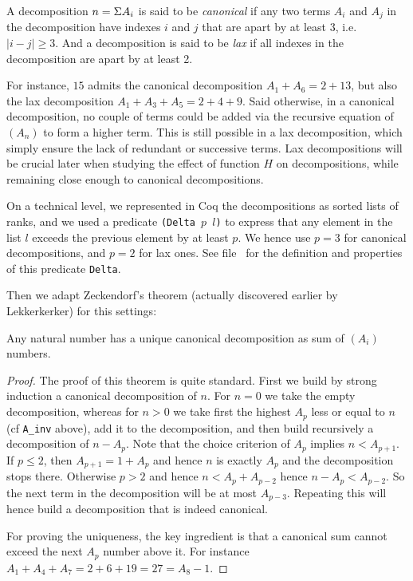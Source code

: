 \documentclass[a4paper,11pt]{article}
\begin{document}
\begin{definition}
 A decomposition $n = \Sigma A_i$ is said to be \emph{canonical} if
 any two terms $A_i$ and $A_j$ in the decomposition have indexes $i$
 and $j$ that are apart by at least 3, i.e. $|i-j|\ge 3$.
 And a decomposition is said to be \emph{lax} if all indexes in the
 decomposition are apart by at least 2.
\end{definition}

For instance, $15$ admits the canonical decomposition
$A_1+A_6 = 2 + 13$, but also the lax decomposition $A_1+A_3+A_5
= 2 + 4 + 9$.
Said otherwise, in a canonical decomposition, no couple of terms could
be added via the recursive equation of $(A_n)$ to form a higher term.
This is still possible in a lax decomposition, which simply ensure
the lack of redundant or successive terms. Lax decompositions will
be crucial later when studying the effect of function $H$ on
decompositions, while remaining close enough to canonical decompositions.

On a technical level, we represented in Coq the decompositions
as sorted lists of ranks, and we used a predicate {\tt (Delta $p$ $l$)}
to express that any element in the list $l$ exceeds the previous
element by at least $p$. We hence use $p=3$ for canonical
decompositions, and $p=2$ for lax ones. See file
\ for the definition and properties of this
predicate {\tt Delta}.

Then we adapt Zeckendorf's theorem (actually discovered earlier by
Lekkerkerker) for this settings:

\begin{theorem}[Zeckendorf]\label{zeck}
Any natural number has a unique canonical decomposition as sum of
$(A_i)$ numbers.
\end{theorem}

\begin{proof}
The proof of this theorem is quite standard. First we build by strong
induction a canonical decomposition of $n$. For $n=0$ we take
the empty decomposition, whereas for
$n>0$ we take first the highest $A_p$ less or equal to $n$
(cf {\tt A\_inv} above), add it to the decomposition,
and then build recursively a decomposition of $n-A_p$.
Note that the choice criterion of $A_p$ implies $n < A_{p+1}$.
If $p\le 2$, then $A_{p+1} = 1 + A_p$ and hence $n$ is exactly $A_p$
and the decomposition stops there. Otherwise $p>2$ and
hence $n < A_p + A_{p-2}$ hence $n-A_p < A_{p-2}$. So the next term in
the decomposition will be at most $A_{p-3}$. Repeating this will hence
build a decomposition that is indeed canonical.

For proving the uniqueness, the key ingredient is that a canonical
sum cannot exceed the next $A_p$ number above it. For instance
$A_1+A_4+A_7 = 2+6+19 = 27 = A_8 - 1$.
\end{proof}
\end{document}
